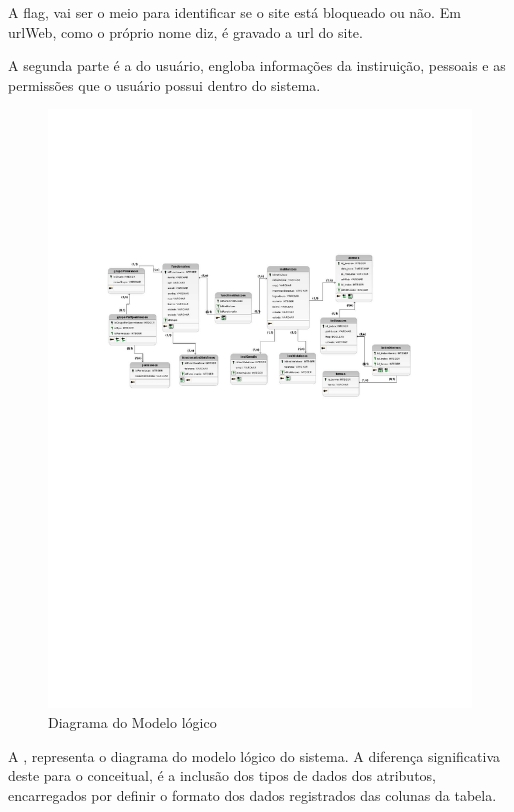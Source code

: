 \documentclass[
  a4paper,%
  12pt,%
  english,%
  brazilian,%
]{article}
\begin{document}
    A flag, vai ser o meio para identificar se o site está bloqueado ou não. Em urlWeb,  como o próprio nome diz, é gravado a url do site.
    
    A segunda parte é a do usuário, engloba informações da instiruição, pessoais e as permissões que o usuário possui dentro do sistema.


    \begin{figure}[H]
        \centering
        \caption{Diagrama do Modelo lógico}
        \label{fig:log}
        \includegraphics[width=\textwidth]{Logos/Logico-ReSist-PDF.pdf}
    \end{figure}

    A  , representa o diagrama do modelo lógico do sistema. A diferença significativa deste para o conceitual, é a inclusão dos tipos de dados dos atributos, encarregados por definir o formato dos dados registrados das colunas da tabela. 
\end{document}
